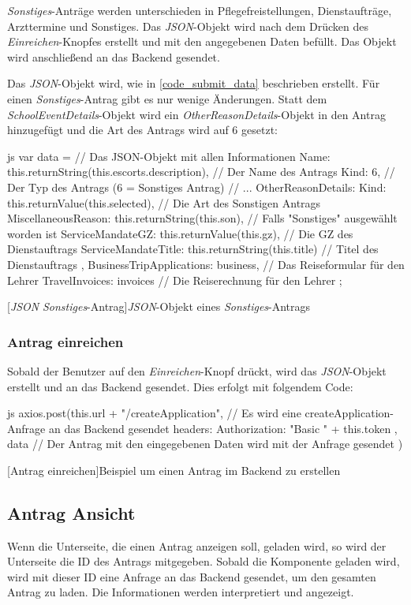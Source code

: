 \textit{Sonstiges}-Anträge werden unterschieden in Pflegefreistellungen, Dienstaufträge, Arzttermine und Sonstiges. Das \textit{JSON}-Objekt wird nach dem Drücken des \textit{Einreichen}-Knopfes erstellt und mit den angegebenen Daten befüllt. Das Objekt wird anschließend an das Backend gesendet.\newpage

Das \textit{JSON}-Objekt wird, wie in \autoref{code_submit_data} beschrieben erstellt. Für einen \textit{Sonstiges}-Antrag gibt es nur wenige Änderungen.
Statt dem \textit{SchoolEventDetails}-Objekt wird ein \textit{OtherReasonDetails}-Objekt in den Antrag hinzugefügt und die Art des Antrags wird auf 6 gesetzt:
\begin{code}{js}
var data = {		// Das JSON-Objekt mit allen Informationen
	Name: this.returnString(this.escorts.description),	// Der Name des Antrags
	Kind: 6,	// Der Typ des Antrags (6 = Sonstiges Antrag)
	// ...
	OtherReasonDetails: {
		Kind: this.returnValue(this.selected),	// Die Art des Sonstigen Antrags
		MiscellaneousReason: this.returnString(this.son),	// Falls "Sonstiges" ausgewählt worden ist
		ServiceMandateGZ: this.returnValue(this.gz),	// Die GZ des Dienstauftrags
		ServiceMandateTitle: this.returnString(this.title)	// Titel des Dienstauftrags
	},
	BusinessTripApplications: business,	// Das Reiseformular für den Lehrer
	TravelInvoices: invoices	// Die Reiserechnung für den Lehrer
};
\end{code}
[\textit{JSON} \textit{Sonstiges}-Antrag]{\textit{JSON}-Objekt eines \textit{Sonstiges}-Antrags}~\\
\subsubsection{Antrag einreichen}
Sobald der Benutzer auf den \textit{Einreichen}-Knopf drückt, wird das \textit{JSON}-Objekt erstellt und an das Backend gesendet. Dies erfolgt mit folgendem Code:
\begin{code}{js}
	axios.post(this.url + "/createApplication", // Es wird eine createApplication-Anfrage an das Backend gesendet
	{
		headers: {
			Authorization: "Basic " + this.token
		}
	},
	data // Der Antrag mit den eingegebenen Daten wird mit der Anfrage gesendet
	)
\end{code}
[Antrag einreichen]{Beispiel um einen Antrag im Backend zu erstellen}~\\
\newpage
\subsection{Antrag Ansicht}
\label{sec:antrag_ansicht}
Wenn die Unterseite, die einen Antrag anzeigen soll, geladen wird, so wird der Unterseite die ID des Antrags mitgegeben. Sobald die Komponente geladen wird, wird mit dieser ID eine Anfrage an das Backend gesendet, um den gesamten Antrag zu laden. Die Informationen werden interpretiert und angezeigt.
